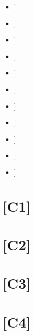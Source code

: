 \begin{fullwidth}

{
\small
\begin{itemize}
	\item[[C1]] 
	\item[[C2]] 
	\item[[C3]] 
	\item[[C4]] 
	\item[[C5]] 
	\item[[C6]] 
	\item[[C7]] 
	\item[[C8]] 
	\item[[C9]] 
	\item[[C10]] 
	\item[[C11]] 
\end{itemize}	
}
	
\chapter*{\color{red}[C1]\\}
\AddToShipoutPictureBG*{%
  \AtPageLowerLeft{%
    \color{red}%
    \rule{\paperwidth}{.38\paperheight}%
  }%
}


\chapter*{\color{red}[C2]\\}
\AddToShipoutPictureBG*{%
  \AtPageLowerLeft{%
    \color{red}%
    \rule{\paperwidth}{.38\paperheight}%
  }%
}


\chapter*{\color{red}[C3]\\}
\AddToShipoutPictureBG*{%
  \AtPageLowerLeft{%
    \color{red}%
    \rule{\paperwidth}{.38\paperheight}%
  }%
}


\chapter*{\color{red}[C4]\\}
\AddToShipoutPictureBG*{%
  \AtPageLowerLeft{%
    \color{red}%
    \rule{\paperwidth}{.38\paperheight}%
  }%
}



\end{fullwidth}
